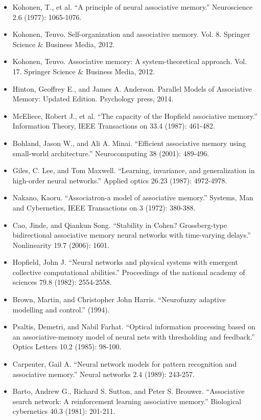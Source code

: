 \documentclass[12pt, a4paper]{article}
\begin{document}
\begin{itemize}
	\item Kohonen, T., et al. ``A principle of neural associative memory.'' Neuroscience 2.6 (1977): 1065-1076.
	\item Kohonen, Teuvo. Self-organization and associative memory. Vol. 8. Springer Science \& Business Media, 2012.
	\item Kohonen, Teuvo. Associative memory: A system-theoretical approach. Vol. 17. Springer Science \& Business Media, 2012.
	\item Hinton, Geoffrey E., and James A. Anderson. Parallel Models of Associative Memory: Updated Edition. Psychology press, 2014.
	\item McEliece, Robert J., et al. ``The capacity of the Hopfield associative memory.'' Information Theory, IEEE Transactions on 33.4 (1987): 461-482.
	\item Bohland, Jason W., and Ali A. Minai. ``Efficient associative memory using small-world architecture.'' Neurocomputing 38 (2001): 489-496.
	\item Giles, C. Lee, and Tom Maxwell. ``Learning, invariance, and generalization in high-order neural networks.'' Applied optics 26.23 (1987): 4972-4978.
	\item Nakano, Kaoru. ``Associatron-a model of associative memory.'' Systems, Man and Cybernetics, IEEE Transactions on 3 (1972): 380-388.
	\item Cao, Jinde, and Qiankun Song. ``Stability in Cohen? Grossberg-type bidirectional associative memory neural networks with time-varying delays.'' Nonlinearity 19.7 (2006): 1601.
	\item Hopfield, John J. ``Neural networks and physical systems with emergent collective computational abilities.'' Proceedings of the national academy of sciences 79.8 (1982): 2554-2558.
	\item Brown, Martin, and Christopher John Harris. ``Neurofuzzy adaptive modelling and control.'' (1994).
	\item Psaltis, Demetri, and Nabil Farhat. ``Optical information processing based on an associative-memory model of neural nets with thresholding and feedback.'' Optics Letters 10.2 (1985): 98-100.
	\item Carpenter, Gail A. ``Neural network models for pattern recognition and associative memory.'' Neural networks 2.4 (1989): 243-257.
	\item Barto, Andrew G., Richard S. Sutton, and Peter S. Brouwer. ``Associative search network: A reinforcement learning associative memory.'' Biological cybernetics 40.3 (1981): 201-211.

\end{itemize}
\end{document}
